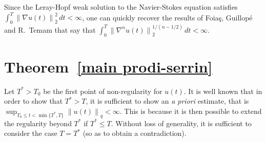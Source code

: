 \documentclass[12pt]{amsart}
\theoremstyle{remark}
\newcommand{\snormo}[1]{{\mathopen\|#1\mathclose\|}}
\begin{document}
Since the Leray-Hopf weak solution to the Navier-Stokes equation satisfies
$\int_0^T \snormo{\nabla u(t)}_2^2 \, dt < \infty$, one can quickly 
recover the results of 
Foia\c s, Guillop\'e and R.~Temam
\cite{foias et al} that say that
$\int_0^T \snormo{\nabla^n u(t)}_2^{1/(n-1/2)} \, dt < \infty$.

\section{Theorem~\ref{main prodi-serrin}}
\label{simple}

Let $T^* > T_0$ be the first point of non-regularity for $u(t)$.
It is well known that 
in order to show that $T^* > T$,
it is sufficient to show an \emph{a priori} estimate, that is
$\sup_{T_0 \le t < \min\{T^*,T\}} \snormo{u(t)}_q < \infty$.
This is because it is then possible to extend the regularity beyond
$T^*$ if $T^* \le T$.
Without loss of generality, it is sufficient to consider the case
$T = T^*$ (so as to obtain a contradiction).
\end{document}
